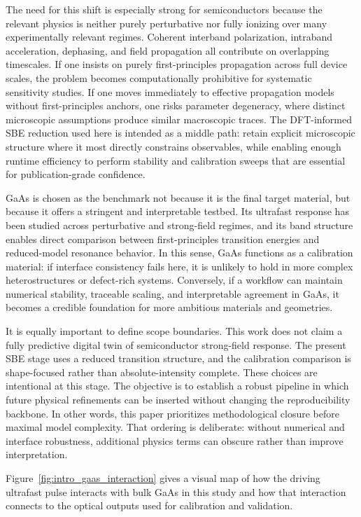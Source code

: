 \documentclass[aps,pra,twocolumn,reprint,superscriptaddress,nofootinbib]{revtex4-2}
\begin{document}
The need for this shift is especially strong for semiconductors because the
relevant physics is neither purely perturbative nor fully ionizing over many
experimentally relevant regimes. Coherent interband polarization, intraband
acceleration, dephasing, and field propagation all contribute on overlapping
timescales. If one insists on purely first-principles propagation across full
device scales, the problem becomes computationally prohibitive for systematic
sensitivity studies. If one moves immediately to effective propagation models
without first-principles anchors, one risks parameter degeneracy, where distinct
microscopic assumptions produce similar macroscopic traces. The DFT-informed
SBE reduction used here is intended as a middle path: retain explicit microscopic
structure where it most directly constrains observables, while enabling enough
runtime efficiency to perform stability and calibration sweeps that are essential
for publication-grade confidence.

GaAs is chosen as the benchmark not because it is the final target material, but
because it offers a stringent and interpretable testbed. Its ultrafast response
has been studied across perturbative and strong-field regimes, and its band
structure enables direct comparison between first-principles transition energies
and reduced-model resonance behavior. In this sense, GaAs functions as a
calibration material: if interface consistency fails here, it is unlikely to
hold in more complex heterostructures or defect-rich systems. Conversely, if a
workflow can maintain numerical stability, traceable scaling, and interpretable
agreement in GaAs, it becomes a credible foundation for more ambitious materials
and geometries.

It is equally important to define scope boundaries. This work does not claim a
fully predictive digital twin of semiconductor strong-field response. The present
SBE stage uses a reduced transition structure, and the calibration comparison is
shape-focused rather than absolute-intensity complete. These choices are
intentional at this stage. The objective is to establish a robust pipeline in
which future physical refinements can be inserted without changing the
reproducibility backbone. In other words, this paper prioritizes methodological
closure before maximal model complexity. That ordering is deliberate: without
numerical and interface robustness, additional physics terms can obscure rather
than improve interpretation.

Figure~\ref{fig:intro_gaas_interaction} gives a visual map of how the driving
ultrafast pulse interacts with bulk GaAs in this study and how that interaction
connects to the optical outputs used for calibration and validation.
\end{document}
